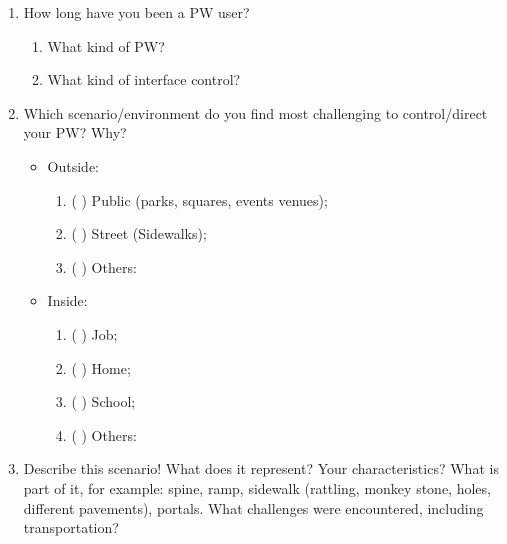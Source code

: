 \begin{enumerate}
\item How long have you been a PW user?
\begin{enumerate}[label=(\alph*)]
\item What kind of PW?
\item What kind of interface control?
\end{enumerate}

\item Which scenario/environment do you find most challenging to control/direct your PW? Why?
\begin{itemize}
\item Outside:
\begin{enumerate}[label=(\alph*)]
\item (    ) Public (parks, squares, events venues);
\item (    ) Street (Sidewalks);
\item (    ) Others:
\end{enumerate}
\item Inside:
\begin{enumerate}[label=(\alph*)]
\item (    ) Job;
\item (    ) Home;
\item (    ) School;
\item (    ) Others:
\end{enumerate}
\end{itemize}
\item Describe this scenario! What does it represent? Your characteristics? What is part of it, for example: spine, ramp, sidewalk (rattling, monkey stone, holes, different pavements), portals. What challenges were encountered, including transportation?
\end{enumerate}

